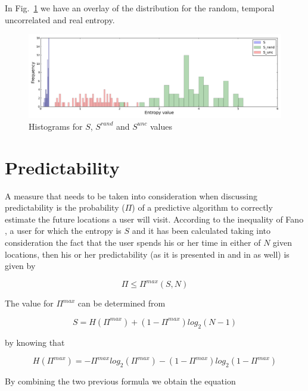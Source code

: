 In Fig.~\ref{dis_overlay} we have an overlay of the distribution for the random,
temporal uncorrelated and real entropy.

\begin{figure}[!h]
\centering
\includegraphics[width=\textwidth]{figures/entro_pred/overlay.png}
\caption{Histograms for $S$, $S^{rand}$ and $S^{unc}$ values}
\label{dis_overlay}
\end{figure}

\section{Predictability}

A measure that needs to be taken into consideration when discussing
predictability is the probability ($\Pi$) of a predictive algorithm to correctly
estimate the future locations a user will visit. According to the inequality of
Fano \cite{brabazon2008natural} \cite{1057678}, a user for which the entropy is
$S$ and it has been calculated taking into consideration the fact that the user
spends his or her time in either of $N$ given locations, then his or her
predictability (as it is presented in \cite{Barabasi10} and in \cite{Sinatra14}
as well) is given by

\begin{equation}
\label{ineq_pred}
\Pi \leq \Pi^{max}(S,N)
\end{equation}

The value for $\Pi^{max}$ can be determined from

\begin{equation}
\label{pred}
S = H(\Pi^{max}) + (1 - \Pi^{max})log_{2}(N-1)  
\end{equation}

by knowing that

\begin{equation}
\label{h_func}
H(\Pi^{max}) = - \Pi^{max}log_{2}(\Pi^{max}) - (1-\Pi^{max})log_{2}(1-\Pi^{max})   
\end{equation}  

By combining the two previous formula we obtain the equation

